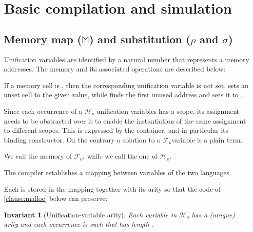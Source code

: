 \documentclass[sigconf,natbib=false,review]{acmart}
\newtheorem{invariant}{Invariant}
\newcommand{\Fo}{\ensuremath{\mathcal{F}_{\!o}\xspace}} %
\newcommand{\Ho}{\ensuremath{\mathcal{H}_o}\xspace}
\newcommand{\mapStore}{\ensuremath{\mathbb{M}}\xspace}
\begin{document}

\section{Basic compilation and simulation}
\label{sec:simulation}


\subsection{Memory map (\mapStore) and substitution ($\rho$ and $\sigma$)}
\label{sec:grounwork}


% 

Unification variables are identified by a
natural number that represents a memory addresses.
The memory and its associated operations are described below:



\noindent
If a memory cell is , then the corresponding unification variable
is not set.  sets an unset cell to the given value, while
 finds the first unused address and sets it to .

Since each occurrence of a \Ho unification variables has a scope,
its assignment needs to be abstracted over it to enable the
instantiation of the same assignment to different scopes.
This is expressed by the  container, and in particular
its  binding constructor.
On the contrary a solution to a \Fo variable is a plain term.




\noindent
We call  the memory of \Fo{}, while we call 
the one of \Ho.

The compiler establishes a mapping between variables of the two languages.



Each  is stored in the mapping together with
its arity so that the code of \ref{clause:malloc} below can preserve:

\begin{invariant}[Unification-variable arity]\label{inv:uvaarity}
  Each variable 
  in \Ho has a (unique) arity  and each occurrence
   is such that  has length .
\end{invariant}
\end{document}
